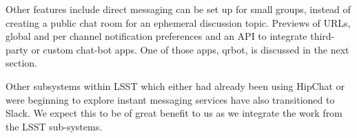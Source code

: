 Other features include direct messaging can be set up for small groups,
instead of creating a public chat room for an ephemeral discussion topic. 
Previews of URLs, global and per channel notification preferences and an 
API to integrate third-party or custom chat-bot apps. One of those apps, 
qrbot, is discussed in the next section.  

Other subsystems within LSST which either had already been using HipChat or
were beginning to explore instant messaging services have also transitioned to 
Slack. We expect this to be of great benefit to us as we integrate the work 
from the LSST sub-systems.


